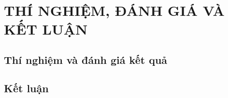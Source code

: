 
\newpage
\chapter{THÍ NGHIỆM, ĐÁNH GIÁ VÀ KẾT LUẬN}

\section{Thí nghiệm và đánh giá kết quả}

\section{Kết luận}

